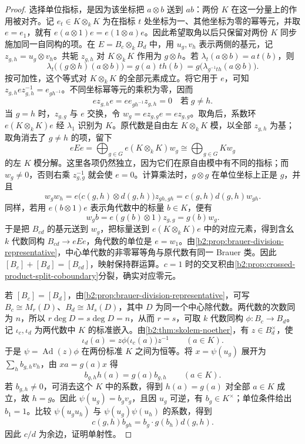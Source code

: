 \begin{proof}
	选择单位指标，是因为该坐标把 \(a\otimes b\) 送到 \(ab\)：两份 \(K\) 在这一分量上的作用被对齐。记 \(e_t\in K\otimes_kK\) 为在指标 \(t\) 处坐标为一、其他坐标为零的幂等元，并取 \(e=e_1\)，就有 \(e(a\otimes1)e=e(1\otimes a)e\)。因此希望取角以后只保留对两份 \(K\) 同步施加同一自同构的项。在 \(E=B_c\otimes_kB_d\) 中，用 \(u_g,v_h\) 表示两侧的基元，记 \(z_{g,h}=u_g\otimes v_h\)。共轭 \(z_{g,h}\) 对 \(K\otimes_kK\) 作用为 \(g\otimes h\)。若 \(\lambda_t(a\otimes b)=a\,t(b)\)，则
	\[
		\lambda_t\bigl((g\otimes h)(a\otimes b)\bigr) =g(a)\,th(b) =g\bigl(\lambda_{g^{-1}th}(a\otimes b)\bigr).
	\]
	按可加性，这个等式对 \(K\otimes_kK\) 的全部元素成立。将它用于 \(e\)，可知 \(z_{g,h}e z_{g,h}^{-1}=e_{gh^{-1}}\)。不同坐标幂等元的乘积为零，因而
	\[
		e z_{g,h}e=e e_{gh^{-1}}z_{g,h}=0\quad\text{若}\;g\ne h.
	\]
	当 \(g=h\) 时，\(z_{g,g}\) 与 \(e\) 交换，令 \(w_g=e z_{g,g}e=e z_{g,g}\)。取角后，系数环 \(e(K\otimes_kK)e\) 经 \(\lambda_1\) 识别为 \(K\)。原代数是自由左 \(K\otimes_kK\) 模，以全部 \(z_{g,h}\) 为基；取角消去了 \(g\ne h\) 的项，留下
	\[
		eEe=\bigoplus_{g\in G}e(K\otimes_kK)w_g \cong\bigoplus_{g\in G}K w_g
	\]
	的左 \(K\) 模分解。这里各项仍然独立，因为它们在原自由模中有不同的指标；而 \(w_g\ne0\)，否则右乘 \(z_{g,g}^{-1}\) 就会使 \(e=0\)。计算乘法时，\(g\otimes g\) 在单位坐标上正是 \(g\)，并且
	\[
		w_g w_h=e\bigl(c(g,h)\otimes d(g,h)\bigr)z_{gh,gh} =c(g,h)d(g,h)w_{gh}.
	\]
	同样，若用 \(e(b\otimes1)e\) 表示角代数中的标量 \(b\in K\)，便有
	\[
		w_g b=e(g(b)\otimes1)z_{g,g}=g(b)w_g.
	\]
	于是把 \(B_{cd}\) 的基元送到 \(w_g\)，把标量送到 \(e(K\otimes_kK)e\) 中的对应元素，得到含幺 \(k\) 代数同构 \(B_{cd}\to eEe\)，角代数的单位是 \(e=w_1\)。由\cref{b2:prop:brauer-division-representative}，中心单代数的非零幂等角与原代数有同一 Brauer 类。因此 \([B_c]+[B_d]=[B_{cd}]\)，映射保持群运算。\(c=1\) 时的交叉积由\cref{b2:prop:crossed-product-split-coboundary}分裂，确实对应零元。

	若 \([B_c]=[B_d]\)，由\cref{b2:prop:brauer-division-representative}，可写 \(B_c\cong M_r(D)\)、\(B_d\cong M_s(D)\)，其中 \(D\) 为同一个中心除代数。两代数的次数同为 \(n\)，所以 \(r\deg D=s\deg D=n\)，从而 \(r=s\)，可取 \(k\) 代数同构 \(\phi:B_c\to B_d\)。记 \(\iota_c,\iota_d\) 为两代数中 \(K\) 的标准嵌入。由\cref{b2:thm:skolem-noether}，有 \(z\in B_d^\times\)，使
	\[
		\iota_d(a)=z\phi\bigl(\iota_c(a)\bigr)z^{-1}\qquad(a\in K).
	\]
	于是 \(\psi=\operatorname{Ad}(z)\phi\) 在两份标准 \(K\) 之间为恒等。将 \(x=\psi(u_g)\) 展开为 \(\sum_h b_{g,h}v_h\)，由 \(xa=g(a)x\) 得
	\[
		b_{g,h}h(a)=g(a)b_{g,h}\qquad(a\in K).
	\]
	若 \(b_{g,h}\ne0\)，可消去这个 \(K\) 中的系数，得到 \(h(a)=g(a)\) 对全部 \(a\in K\) 成立，故 \(h=g\)。因此 \(\psi(u_g)=b_gv_g\)，且因 \(u_g\) 可逆，有 \(b_g\in K^\times\)；单位条件给出 \(b_1=1\)。比较 \(\psi(u_g u_h)\) 与 \(\psi(u_g)\psi(u_h)\) 的系数，得到
	\[
		c(g,h)b_{gh}=b_g\cdot g(b_h)d(g,h).
	\]
	因此 \(c/d\) 为余边，证明单射性。


\end{proof}
